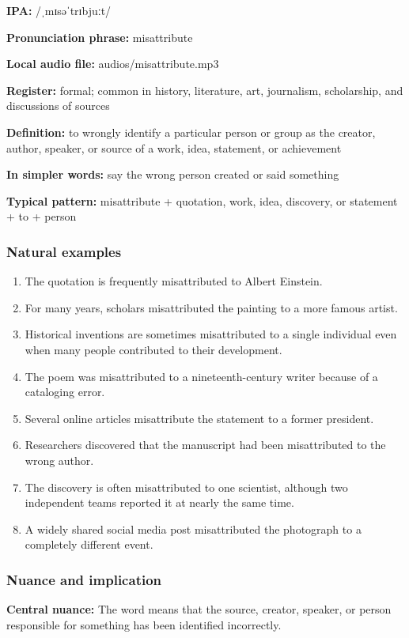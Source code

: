 \documentclass[11pt]{article}
\begin{document}
\textbf{IPA:} /ˌmɪsəˈtrɪbjuːt/

\textbf{Pronunciation phrase:} misattribute

\textbf{Local audio file:} audios/misattribute.mp3

\textbf{Register:} formal; common in history, literature, art, journalism, scholarship, and discussions of sources

\textbf{Definition:} to wrongly identify a particular person or group as the creator, author, speaker, or source of a work, idea, statement, or achievement

\textbf{In simpler words:} say the wrong person created or said something

\textbf{Typical pattern:} misattribute + quotation, work, idea, discovery, or statement + to + person

\subsubsection{Natural examples}
\begin{enumerate}
  \item The quotation is frequently misattributed to Albert Einstein.
  \item For many years, scholars misattributed the painting to a more famous artist.
  \item Historical inventions are sometimes misattributed to a single individual even when many people contributed to their development.
  \item The poem was misattributed to a nineteenth-century writer because of a cataloging error.
  \item Several online articles misattribute the statement to a former president.
  \item Researchers discovered that the manuscript had been misattributed to the wrong author.
  \item The discovery is often misattributed to one scientist, although two independent teams reported it at nearly the same time.
  \item A widely shared social media post misattributed the photograph to a completely different event.
\end{enumerate}

\subsubsection{Nuance and implication}
\textbf{Central nuance:} The word means that the source, creator, speaker, or person responsible for something has been identified incorrectly.
\end{document}
